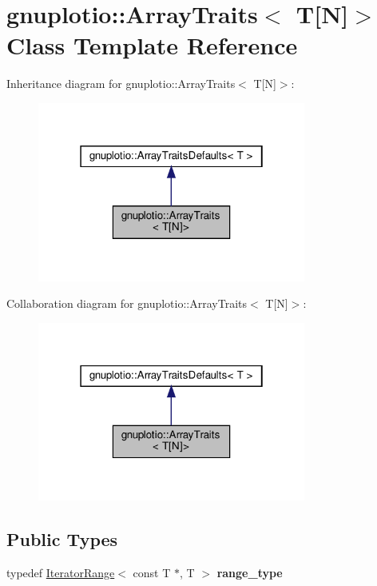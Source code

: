 \hypertarget{classgnuplotio_1_1ArrayTraits_3_01T[N]_4}{}\section{gnuplotio\+:\+:Array\+Traits$<$ T\mbox{[}N\mbox{]}$>$ Class Template Reference}
\label{classgnuplotio_1_1ArrayTraits_3_01T[N]_4}


Inheritance diagram for gnuplotio\+:\+:Array\+Traits$<$ T\mbox{[}N\mbox{]}$>$\+:
\nopagebreak
\begin{figure}[H]
\begin{center}
\leavevmode
\includegraphics[width=250pt]{classgnuplotio_1_1ArrayTraits_3_01T[N]_4__inherit__graph}
\end{center}
\end{figure}


Collaboration diagram for gnuplotio\+:\+:Array\+Traits$<$ T\mbox{[}N\mbox{]}$>$\+:
\nopagebreak
\begin{figure}[H]
\begin{center}
\leavevmode
\includegraphics[width=250pt]{classgnuplotio_1_1ArrayTraits_3_01T[N]_4__coll__graph}
\end{center}
\end{figure}
\subsection*{Public Types}
\begin{DoxyCompactItemize}
\item 
\mbox{\label{classgnuplotio_1_1ArrayTraits_3_01T[N]_4_a926f3c3d14fbe82aab7b70ccc16d20fb}} 
typedef \hyperlink{classgnuplotio_1_1IteratorRange}{Iterator\+Range}$<$ const T $\ast$, T $>$ {\bfseries range\+\_\+type}
\end{DoxyCompactItemize}
